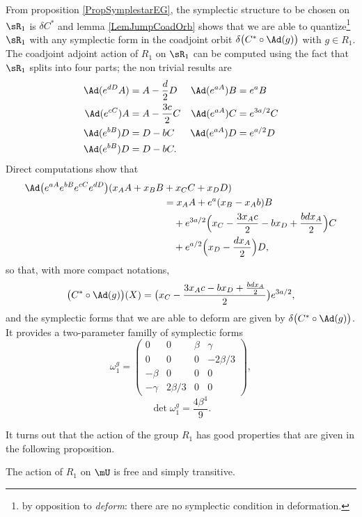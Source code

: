 From proposition \ref{PropSymplestarEG}, the symplectic structure to be chosen on $\sR_1$ is $\delta C^*$ and lemma \ref{LemJumpCoadOrb} shows that we are able to quantize\footnote{by opposition to \emph{deform}: there are no symplectic condition in deformation.} $\sR_1$ with any symplectic form in the coadjoint orbit $\delta\big( C^*\circ\Ad(g) \big)$ with $g\in R_1$. The coadjoint adjoint action of $R_1$ on $\sR_1$ can be computed using the fact that $\sR_1$ splits into four parts; the non trivial results are
\begin{align*}
\Ad( e^{dD}A)&=A-\frac{ d }{2}D			&\Ad( e^{aA})B&= e^{a}B\\
\Ad( e^{cC})A&=A-\frac{ 3c }{2}C		&\Ad( e^{aA})C&= e^{3a/2}C\\
\Ad( e^{bB})D&=D-bC				&\Ad( e^{aA})D&= e^{a/2}D\\
\Ad( e^{bB})D&=D-bC.
\end{align*}
Direct computations show that
\begin{equation}
\begin{split}
	\Ad\big(  e^{aA} e^{bB} e^{cC} e^{dD} \big)(x_AA+x_BB&+x_CC+x_DD)\\
			&=x_AA+ e^{a}(x_B-x_Ab)B\\
			&\quad + e^{3a/2}\Big( x_C-\frac{ 3x_Ac }{2}-bx_D +\frac{ bdx_A }{2} \Big)C\\
			&\quad+ e^{a/2}\Big( x_D-\frac{ dx_A }{2} \Big)D,
\end{split}
\end{equation}
so that, with more compact notations, 
\begin{align}
\big( C^*\circ\Ad(g) \big)(X)=\big( x_C-\frac{ 3x_Ac-bx_D+\frac{ bdx_A }{2} }{2} \big) e^{3a/2},
\end{align}
and the symplectic forms that we are able to deform are given by $\delta\big( C^*\circ\Ad(g) \big)$. It provides a two-parameter familly of symplectic forms
\begin{equation}
\omega_1^g=
\begin{pmatrix}
0&0&\beta&\gamma\\
0&0&0&-2\beta/3\\
-\beta&0&0&0\\
-\gamma&2\beta/3&0&0
\end{pmatrix},
\end{equation}
\[ 
  \det\omega_1^g=\frac{ 4\beta^4 }{ 9 }.
\]



It turns out that the action of the group $R_1$ has good properties that are given in the following proposition.
\begin{proposition}   
The action of $R_1$ on $\mU$ is free and simply transitive.
\label{PropCRunXXX}
\end{proposition}

